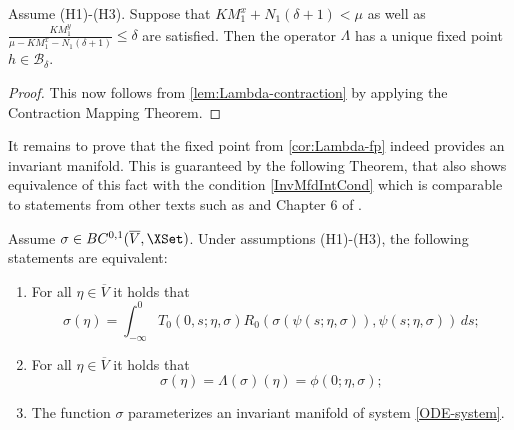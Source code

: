 \documentclass[a4paper]{siamart190516}
\begin{document}
 \begin{corollary}\label{cor:Lambda-fp}
Assume (H1)-(H3). Suppose that $K M_1^x+N_1(\delta +1) < \mu$ as well as  $\frac{K M_1^y}{\mu-K M_1^x-N_1(\delta +1)}  \leq \delta$ are satisfied. Then the operator $\Lambda$ has a unique fixed point $h \in \mathcal{B}_{\delta}$.
 \end{corollary}
 
 \begin{proof}
 This now follows from 
 \cref{lem:Lambda-contraction} by applying the Contraction Mapping Theorem.
 \end{proof}
 
 It remains to prove that the fixed point from \cref{cor:Lambda-fp} indeed provides an
 invariant manifold. This is guaranteed by the following Theorem, that also shows
 equivalence of this fact with the condition \cref{InvMfdIntCond} which is
 comparable to statements from other texts such as \cite{Sa90} and Chapter 6 of
 \cite{He81}. 
 
 \begin{theorem}\label{thm:slow-mfd-eqv}
Assume $\sigma \in BC^{0,1}(\overline{V},\XSet)$. Under assumptions (H1)-(H3), the following statements are equivalent:
 \begin{enumerate}
\item For all $\eta \in \overline{V}$ it holds that
 \begin{equation}\label{InvMfdIntCond}
 \sigma(\eta) = \int_{-\infty}^0 T_0(0,s; \eta,\sigma) R_0(\sigma(\psi(s;\eta,\sigma)),\psi(s;\eta,\sigma)) \, ds;
 \end{equation}
 \item For all $\eta \in \overline{V}$ it holds that
 \[
\sigma(\eta) = \Lambda(\sigma)(\eta) = \phi(0; \eta, \sigma);
 \] 
 \item The function $\sigma$ parameterizes an invariant manifold of system \cref{ODE-system}.
 \end{enumerate}
 \end{theorem}
 
\end{document}
